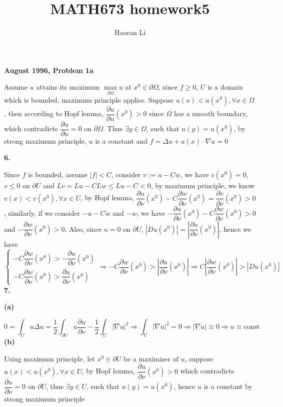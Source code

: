 \documentclass[12pt]{article}
\title{MATH673 homework5}
\author{Haoran Li}
\date{}
\begin{document}
\maketitle
\textbf{August 1996, Problem 1a} \par
Assume $u$ attains its maximum $\displaystyle\underset{\partial\Omega}{\max}u$ at $x^0\in\partial\Omega$, since $f\geq 0$, $U$ is a domain which is bounded, maximum principle applies. Suppose $u(x)<u(x^0), \forall x\in \Omega$, then according to Hopf lemma, $\dfrac{\partial u}{\partial n}(x^0)>0$ since $\Omega$ has a smooth boundary, which contradicts $\dfrac{\partial u}{\partial n}=0$ on $\partial\Omega$. Thus $\exists y\in\Omega$, such that $u(y)=u(x^0)$, by strong maximum principle, $u$ is a constant and $f=\Delta u+a(x)\cdot\nabla u=0$ \par
\textbf{6.} \par
Since $f$ is bounded, assume $|f|<C$, consider $v:=u-Cw$, we have $v(x^0)=0$, $v\leq 0$ on $\partial U$ and $Lv=Lu-CLw\leq Lu-C<0$, by maximum principle, we know $v(x)<v(x^0), \forall x\in U$, by Hopf lemma, $\dfrac{\partial u}{\partial\nu}(x^0)-C\dfrac{\partial w}{\partial\nu}(x^0)=\dfrac{\partial v}{\partial\nu}(x^0)>0$, similarly, if we consider $-u-Cw$ and $-w$, we have $-\dfrac{\partial u}{\partial\nu}(x^0)-C\dfrac{\partial w}{\partial\nu}(x^0)>0$ and $-\dfrac{\partial w}{\partial\nu}(x^0)>0$. Also, since $u=0$ on $\partial U$, $\left|Du(x^0)\right|=\left|\dfrac{\partial u}{\partial\nu}(x^0)\right|$, hence we have
\[
\left\{
 \begin{matrix}
 -C\dfrac{\partial w}{\partial\nu}(x^0)>-\dfrac{\partial u}{\partial\nu}(x^0) \\
-C\dfrac{\partial w}{\partial\nu}(x^0)>\dfrac{\partial u}{\partial\nu}(x^0)
 \end{matrix}
\right.
\Rightarrow
-C\dfrac{\partial w}{\partial\nu}(x^0)>\left|\dfrac{\partial u}{\partial\nu}(x^0)\right|
\Rightarrow
C\left|\dfrac{\partial w}{\partial\nu}(x^0)\right|>\left|Du(x^0)\right|
\]
\textbf{7.} \par
\textbf{(a)} \par
\[
0=\int_U u\Delta u=\dfrac{1}{2}\int_{\partial U}u\dfrac{\partial u}{\partial\nu}-\dfrac{1}{2}\int_U |\nabla u|^2 \Rightarrow \int_U |\nabla u|^2=0 \Rightarrow |\nabla u|\equiv 0 \Rightarrow u\equiv \text{const}
\]
\textbf{(b)} \par
Using maximum principle, let $x^0\in\partial U$ be a maximizer of $u$, suppose $u(x)<u(x^0), \forall x\in U$, by Hopf lemma, $\dfrac{\partial u}{\partial\nu}(x^0)>0$ which contradicts $\dfrac{\partial u}{\partial\nu}=0$ on $\partial U$, thus $\exists y\in U$, such that $u(y)=u(x^0)$, hence $u$ is a constant by strong maximum principle \par
\end{document}
